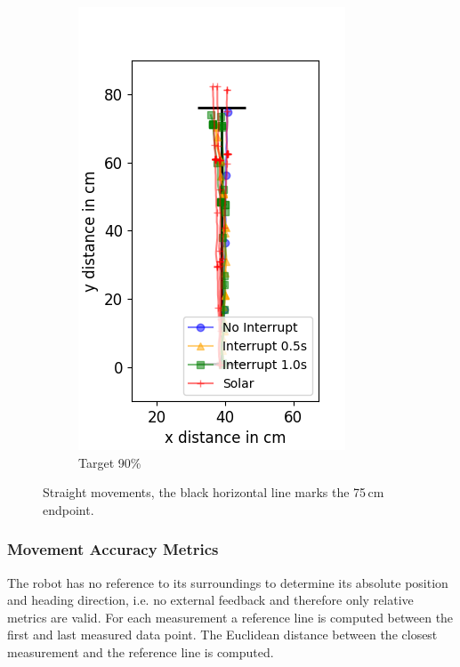 \begin{figure}
\begin{subfigure}[b]{0.32\textwidth}
		\includegraphics[width=\textwidth]{pics/straight_90.png}
		\caption{Target 90\%}
		\label{fig:stra_exp3}
	\end{subfigure}
	\caption{Straight movements, the black horizontal line marks the 75\,cm endpoint.}
	\label{fig:straight_movements}
\end{figure}

\subsubsection{Movement Accuracy Metrics}

The robot has no reference to its surroundings to determine its absolute position and heading direction, i.e. no external feedback and therefore only relative metrics are valid.
For each measurement a reference line is computed between the first and last measured data point.
The Euclidean distance between the closest measurement and the reference line is computed.

